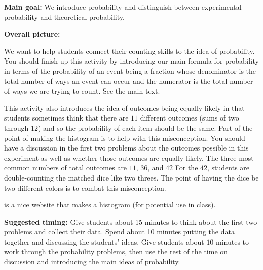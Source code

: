 \documentclass[handout]{ximera}
\begin{document}
\begin{instructorNotes}
{\bf Main goal:} We introduce probability and distinguish between experimental probability and theoretical probability.

{\bf Overall picture:} 

We want to help students connect their counting skills to the idea of probability. You should finish up this activity by introducing our main formula for probability in terms of the probability of an event being a fraction whose denominator is the total number of ways an event can occur and the numerator is the total number of ways we are trying to count.  See the main text.

This activity also introduces the idea of outcomes being equally likely in that students sometimes think that there are $11$ different outcomes (sums of two through $12$) and so the probability of each item should be the same. Part of the point of making the histogram is to help with this misconception. You should have a discussion in the first two problems about the outcomes possible in this experiment as well as whether those outcomes are equally likely.  The three most common numbers of total outcomes are $11$, $36$, and $42$ For the $42$, students are double-counting the matched dice like two threes. The point of having the dice be two different colors is to combat this misconception.

 is a nice website that makes a histogram (for potential use in class).

{\bf Suggested timing:} Give students about 15 minutes to think about the first two problems and collect their data. Spend about 10 minutes putting the data together and discussing the students' ideas. Give students about $10$ minutes to work through the probability problems, then use the rest of the time on discussion and introducing the main ideas of probability.


\end{instructorNotes}
\end{document}
